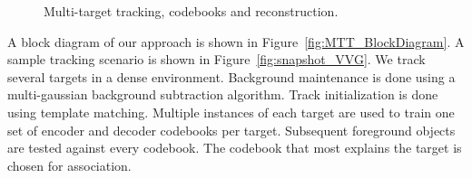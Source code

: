 \documentclass[12pt,letterpaper,doublespaced,ETD,proposal]{gt-ece-thesis}
\begin{document}
\begin{Body}
			\begin{figure}%
						\centering	
						\caption{Multi-target tracking, codebooks and reconstruction.} 
						\label{fig:Codebooks_and_reconstruction}				
			\end{figure}
						
A block diagram of our approach is shown in Figure~\ref{fig:MTT_BlockDiagram}.  A sample tracking scenario is shown in Figure~\ref{fig:snapshot_VVG}.  We track several targets in a dense environment.  Background maintenance is done using a multi-gaussian background subtraction algorithm.  Track initialization is done using template matching.  Multiple instances of each target are used to train one set of encoder and decoder codebooks per target.  Subsequent foreground objects are tested against every codebook.  The codebook that most explains the target is chosen for association.
			

\end{Body}
\end{document}

